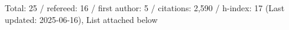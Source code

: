 Total: 25 / refereed: 16 / first author: 5 / citations: 2,590 / h-index: 17 (Last updated: 2025-06-16), List attached below